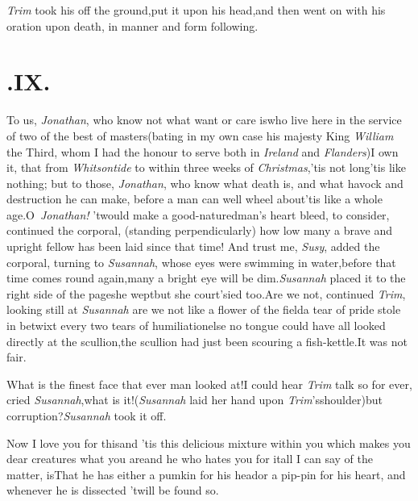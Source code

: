\documentclass{article}
\begin{document}
\textit{Trim} took his off the ground,\tsk put it upon his
head,\tsk and then went on with his oration upon death, in manner
and form following.

\section{.\enspace  IX.}

\quad\tsk  To us, \textit{Jonathan}, who know not what want or
care is\tsk who live here in the service of two of the best of
masters\break\tsk (bating in my own case his majesty King
\textit{William} the Third, whom I had the honour to serve
both in \textit{Ireland} and \textit{Flanders})\tsk I own it,
that from \textit{Whitson\-tide} to within three weeks of
\textit{Christmas},\tsk\break ’tis not long\tsk ’tis like nothing;\tsk
but to those, \textit{Jonathan}, who know what death is, and
what havock and destruction he can make, before a man can well
wheel about\tsk ’tis like a whole age.\tsk O~\textit{Jona\-than!}
’twould make a good-natured\break man’s heart bleed, to consider,
continued the corporal, (standing perpendicularly) how low many
a brave and upright fellow has been laid since that time!\tsk
And trust me, \textit{Susy}, added the corporal, turning to
\textit{Susannah}, whose eyes were swimming in water,\tsk before
that time comes round again,\tsk many a bright eye will be
dim.\tsk \textit{Susannah} placed it to the right side of the
page\tsk she wept\tsk but she court’sied too.\tsk Are we not,
continued \textit{Trim}, looking still at \textit{Susannah}\tsk
are we not like a flower of the field\tsk a tear of pride stole
in betwixt every two tears of humiliation\tsk else no tongue
could have \break{}
all looked directly at the scullion,\tsk the scullion had just been
scouring a fish-kettle.\tsk It was not fair.\tsh


\tsk What is the finest face that ever man looked at!\tsk I
could hear \textit{Trim} talk so for ever, cried
\textit{Susannah},\tsk what is it!\break (\textit{Susannah} laid her hand
upon \textit{Trim}’s\break shoulder)\tsk but
corruption?\tsh \textit{Susannah} took it off.

\tsk Now I love you for this\tsk and ’tis this delicious
mixture within you which makes you dear creatures what you
are\tsk and he who hates you for it\tsh all I\break
can say of the matter, is\tsk That he has\break 
either a pumkin for his head\tsk or a pip-\break pin for his heart,\tsk
and whenever he is\break
dissected ’twill be found so.
\end{document}
